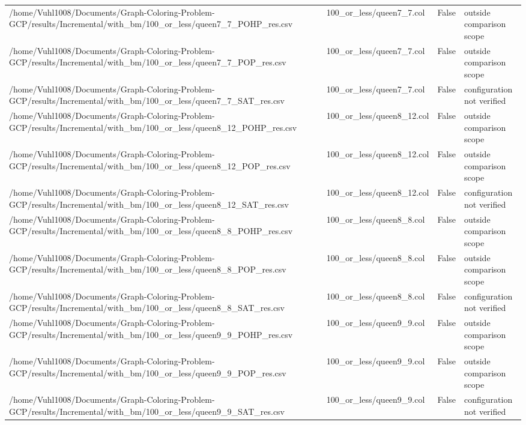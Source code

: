 \begin{table}[htbp]
\begin{tabular}{llll}
/home/Vuhl1008/Documents/Graph-Coloring-Problem-GCP/results/Incremental/with\_bm/100\_or\_less/queen7\_7\_POHP\_res.csv & 100\_or\_less/queen7\_7.col & False & outside comparison scope \\
/home/Vuhl1008/Documents/Graph-Coloring-Problem-GCP/results/Incremental/with\_bm/100\_or\_less/queen7\_7\_POP\_res.csv & 100\_or\_less/queen7\_7.col & False & outside comparison scope \\
/home/Vuhl1008/Documents/Graph-Coloring-Problem-GCP/results/Incremental/with\_bm/100\_or\_less/queen7\_7\_SAT\_res.csv & 100\_or\_less/queen7\_7.col & False & configuration not verified \\
/home/Vuhl1008/Documents/Graph-Coloring-Problem-GCP/results/Incremental/with\_bm/100\_or\_less/queen8\_12\_POHP\_res.csv & 100\_or\_less/queen8\_12.col & False & outside comparison scope \\
/home/Vuhl1008/Documents/Graph-Coloring-Problem-GCP/results/Incremental/with\_bm/100\_or\_less/queen8\_12\_POP\_res.csv & 100\_or\_less/queen8\_12.col & False & outside comparison scope \\
/home/Vuhl1008/Documents/Graph-Coloring-Problem-GCP/results/Incremental/with\_bm/100\_or\_less/queen8\_12\_SAT\_res.csv & 100\_or\_less/queen8\_12.col & False & configuration not verified \\
/home/Vuhl1008/Documents/Graph-Coloring-Problem-GCP/results/Incremental/with\_bm/100\_or\_less/queen8\_8\_POHP\_res.csv & 100\_or\_less/queen8\_8.col & False & outside comparison scope \\
/home/Vuhl1008/Documents/Graph-Coloring-Problem-GCP/results/Incremental/with\_bm/100\_or\_less/queen8\_8\_POP\_res.csv & 100\_or\_less/queen8\_8.col & False & outside comparison scope \\
/home/Vuhl1008/Documents/Graph-Coloring-Problem-GCP/results/Incremental/with\_bm/100\_or\_less/queen8\_8\_SAT\_res.csv & 100\_or\_less/queen8\_8.col & False & configuration not verified \\
/home/Vuhl1008/Documents/Graph-Coloring-Problem-GCP/results/Incremental/with\_bm/100\_or\_less/queen9\_9\_POHP\_res.csv & 100\_or\_less/queen9\_9.col & False & outside comparison scope \\
/home/Vuhl1008/Documents/Graph-Coloring-Problem-GCP/results/Incremental/with\_bm/100\_or\_less/queen9\_9\_POP\_res.csv & 100\_or\_less/queen9\_9.col & False & outside comparison scope \\
/home/Vuhl1008/Documents/Graph-Coloring-Problem-GCP/results/Incremental/with\_bm/100\_or\_less/queen9\_9\_SAT\_res.csv & 100\_or\_less/queen9\_9.col & False & configuration not verified \\

\end{tabular}
\end{table}
